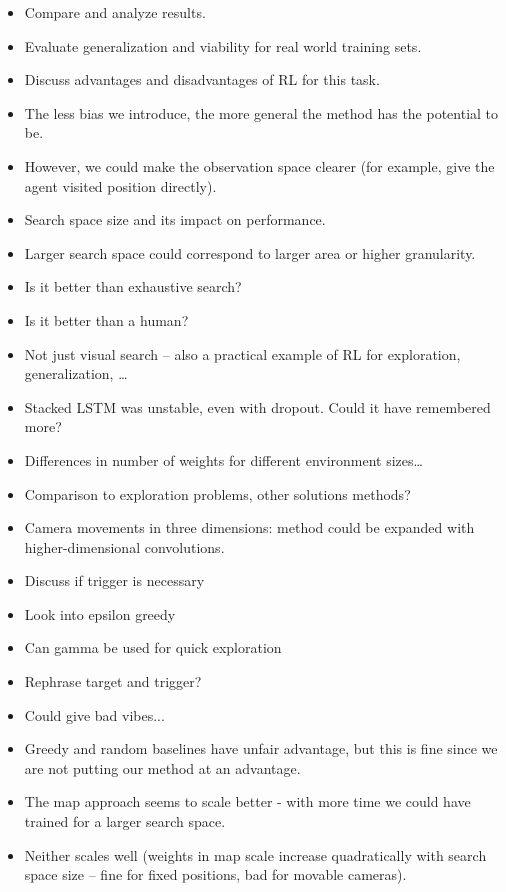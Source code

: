 \begin{itemize}
    \item Compare and analyze results.
    \item Evaluate generalization and viability for real world training sets. 
    \item Discuss advantages and disadvantages of RL for this task.
    \item The less bias we introduce, the more general the method has the potential to be.
    \item However, we could make the observation space clearer (for example, give the agent visited position directly).
    \item Search space size and its impact on performance.
    \item Larger search space could correspond to larger area or higher granularity.
    \item Is it better than exhaustive search?
    \item Is it better than a human?
    \item Not just visual search -- also a practical example of RL for exploration, generalization, \dots
    \item Stacked LSTM was unstable, even with dropout. Could it have remembered more?
    \item Differences in number of weights for different environment sizes\dots
    \item Comparison to exploration problems, other solutions methods?
    \item Camera movements in three dimensions: method could be expanded with higher-dimensional convolutions. 
    \item Discuss if trigger is necessary
    \item Look into epsilon greedy
    \item Can gamma be used for quick exploration
    \item Rephrase target and trigger?
    \item Could give bad vibes...
    \item Greedy and random baselines have unfair advantage, but this is fine since we are not putting our method at an advantage.
    \item The map approach seems to scale better - with more time we could have trained for a larger search space.
    \item Neither scales well (weights in map scale increase quadratically with search space size -- fine for fixed positions, bad for movable cameras).

\end{itemize}
